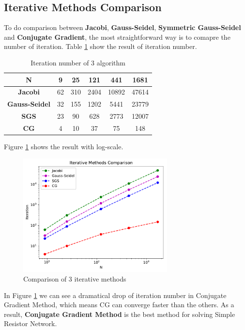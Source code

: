 \documentclass{article}
\begin{document}
\subsection{Iterative Methods Comparison}
To do comparison between \textbf{Jacobi}, \textbf{Gauss-Seidel}, \textbf{Symmetric Gauss-Seidel} and \textbf{Conjugate Gradient}, the most
straightforward way is to comapre the number of iteration. Table \ref{tab:3 iter} show the result of iteration number.
\begin{table}[H]
	\begin{center}
		\begin{tabular}{|c|c|c|c|c|c|}
			\hline
			\textbf{N} & 9 & 25 & 121 & 441 & 1681 \\ \hline
			\textbf{Jacobi} & 62 & 310 & 2404 & 10892 & 47614 \\ \hline
			\textbf{Gauss-Seidel} & 32 & 155 & 1202 & 5441 & 23779 \\ \hline
			\textbf{SGS} & 23 & 90 & 628 & 2773 & 12007 \\ \hline
			\textbf{CG} & 4 & 10 & 37 & 75 & 148 \\ \hline
		\end{tabular}
	\end{center}
\caption{Iteration number of 3 algorithm}
\label{tab:3 iter}
\end{table}
Figure \ref{fig:iter comparison} shows the result with log-scale.
\begin{figure}[H]
	\centering
	\includegraphics[width=0.7\textwidth]{src/iter.pdf}
	\caption{Comparison of 3 iterative methods}
	\label{fig:iter comparison}
\end{figure}
In Figure \ref{fig:iter comparison} we can see a dramatical drop of iteration number in Conjugate Gradient Method, which means CG can converge 
faster than the others. As a result, \textbf{Conjugate Gradient Method} is the best method for solving Simple Resistor Network.
\end{document}
